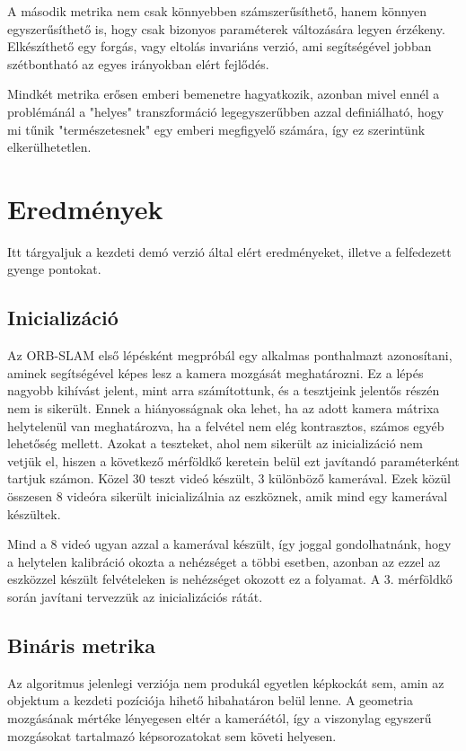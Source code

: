 A második metrika nem csak könnyebben számszerűsíthető, hanem könnyen egyszerűsíthető is, hogy csak bizonyos paraméterek változására legyen érzékeny.
Elkészíthető egy forgás, vagy eltolás invariáns verzió, ami segítségével jobban szétbontható az egyes irányokban elért fejlődés.

Mindkét metrika erősen emberi bemenetre hagyatkozik, azonban mivel ennél a problémánál a "helyes" transzformáció legegyszerűbben azzal definiálható, hogy mi tűnik "természetesnek" egy emberi megfigyelő számára, így ez szerintünk elkerülhetetlen.

\section{Eredmények}

Itt tárgyaljuk a kezdeti demó verzió által elért eredményeket, illetve a felfedezett gyenge pontokat.

\subsection{Inicializáció}

Az ORB-SLAM első lépésként megpróbál egy alkalmas ponthalmazt azonosítani, aminek segítségével képes lesz a kamera mozgását meghatározni.
Ez a lépés nagyobb kihívást jelent, mint arra számítottunk, és a tesztjeink jelentős részén nem is sikerült.
Ennek a hiányosságnak oka lehet, ha az adott kamera mátrixa helytelenül van meghatározva, ha a felvétel nem elég kontrasztos, számos egyéb lehetőség mellett.
Azokat a teszteket, ahol nem sikerült az inicializáció nem vetjük el, hiszen a következő mérföldkő keretein belül ezt javítandó paraméterként tartjuk számon.
Közel 30 teszt videó készült, 3 különböző kamerával.
Ezek közül összesen 8 videóra sikerült inicializálnia az eszköznek, amik mind egy kamerával készültek.

Mind a 8 videó ugyan azzal a kamerával készült, így joggal gondolhatnánk, hogy a helytelen kalibráció okozta a nehézséget a többi esetben, azonban az ezzel az eszközzel készült felvételeken is nehézséget okozott ez a folyamat.
A 3. mérföldkő során javítani tervezzük az inicializációs rátát.

\subsection{Bináris metrika}

Az algoritmus jelenlegi verziója nem produkál egyetlen képkockát sem, amin az objektum a kezdeti pozíciója hihető hibahatáron belül lenne.
A geometria mozgásának mértéke lényegesen eltér a kameráétól, így a viszonylag egyszerű mozgásokat tartalmazó képsorozatokat sem követi helyesen.

